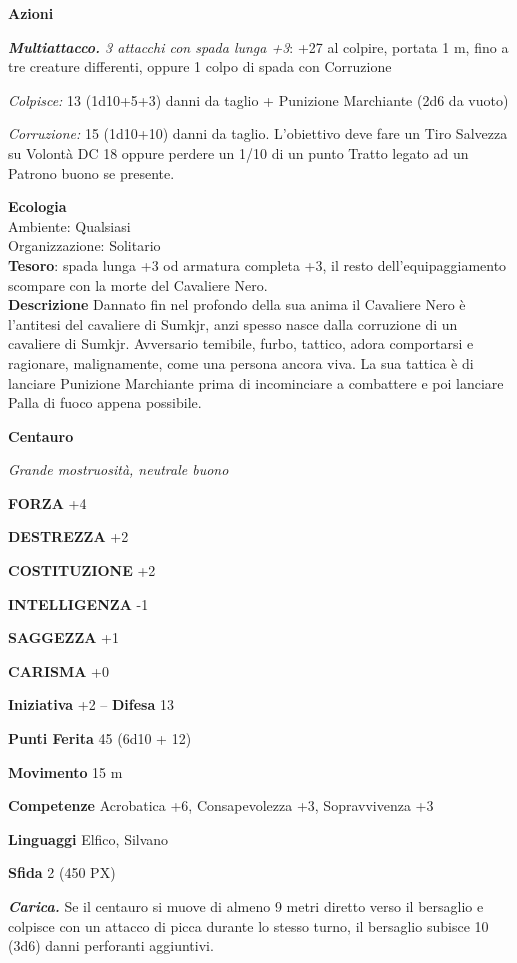 \begin{multicols}{2}
	\textbf{Azioni}

	\textit{\textbf{Multiattacco.} 3 attacchi con spada lunga +3}: +27 al colpire, portata 1 m, fino a tre creature differenti, oppure 1 colpo di spada con Corruzione

	\textit{Colpisce:} 13 (1d10+5+3) danni da taglio + Punizione Marchiante (2d6 da vuoto)

	\textit{Corruzione:} 15 (1d10+10) danni da taglio. L'obiettivo deve fare un Tiro Salvezza su Volontà DC 18 oppure perdere un 1/10 di un punto Tratto legato ad un Patrono buono se presente.

	\textbf{Ecologia}\\
	Ambiente: Qualsiasi\\
	Organizzazione: Solitario\\
	\textbf{Tesoro}: spada lunga +3 od armatura completa +3, il resto dell'equipaggiamento scompare con la morte del Cavaliere Nero.\\

	\textbf{Descrizione}
	Dannato fin nel profondo della sua anima il Cavaliere Nero è l'antitesi del cavaliere di Sumkjr, anzi spesso nasce dalla corruzione di un cavaliere di Sumkjr. Avversario temibile, furbo, tattico, adora comportarsi e ragionare, malignamente, come una persona ancora viva. La sua tattica è di lanciare Punizione Marchiante prima di incominciare a combattere e poi lanciare Palla di fuoco appena possibile.

	\medskip{}\textbf{Centauro}

	\textit{Grande mostruosità, neutrale buono}

	\textbf{FORZA} +4

	\textbf{DESTREZZA} +2

	\textbf{COSTITUZIONE} +2

	\textbf{INTELLIGENZA} -1

	\textbf{SAGGEZZA} +1

	\textbf{CARISMA} +0

	\textbf{Iniziativa} +2 -- \textbf{Difesa} 13

	\textbf{Punti Ferita} 45 (6d10 + 12)

	\textbf{Movimento} 15 m

	\textbf{Competenze} Acrobatica +6, Consapevolezza +3, Sopravvivenza +3

	\textbf{Linguaggi} Elfico, Silvano

	\textbf{Sfida} 2 (450 PX)

	\textit{\textbf{Carica.}} Se il centauro si muove di almeno 9 metri diretto verso il bersaglio e colpisce con un attacco di picca durante lo stesso turno, il bersaglio subisce 10 (3d6) danni perforanti aggiuntivi.


\end{multicols}
